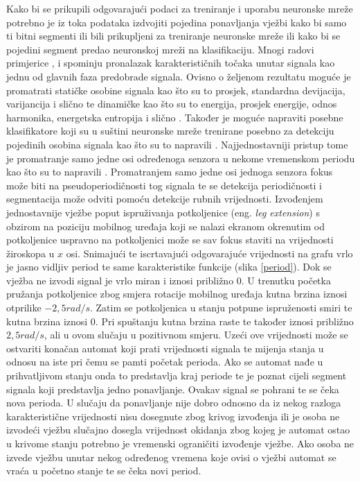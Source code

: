 \documentclass[times, utf8, diplomski]{fer}
\begin{document}
Kako bi se prikupili odgovarajući podaci za treniranje i uporabu neuronske mreže potrebno je iz toka podataka izdvojiti pojedina ponavljanja vježbi kako bi samo ti bitni
segmenti ili bili prikupljeni za treniranje neuronske mreže ili kako bi se pojedini segment predao neuronskoj mreži na klasifikaciju. 
Mnogi radovi primjerice \cite{android}, \cite{exo} i \cite{LowerLimb} spominju pronalazak karakterističnih točaka unutar signala
kao jednu od glavnih faza predobrade signala. Ovisno o željenom rezultatu moguće je promatrati statičke osobine signala
kao što su to prosjek, standardna devijacija, varijancija i slično te dinamičke kao što su to energija, prosjek energije, odnos
harmonika, energetska entropija i slično \citep{android}. Također je moguće napraviti posebne klasifikatore koji su u suštini
neuronske mreže trenirane posebno za detekciju pojedinih osobina signala kao što su to napravili \cite{exo}. 
Najjednostavniji pristup tome je promatranje samo jedne osi određenoga senzora u nekome vremenskom periodu kao što su to napravili
\cite{LowerLimb}. Promatranjem samo jedne osi jednoga senzora fokus može biti na pseudoperiodičnosti tog signala te se detekcija
periodičnosti i segmentacija može odviti pomoću detekcije rubnih vrijednosti. Izvođenjem jednostavnije vježbe poput ispruživanja
potkoljenice (eng. \textit{leg extension}) s obzirom na poziciju mobilnog uređaja koji se nalazi ekranom okrenutim od potkoljenice uspravno na
potkoljenici može se sav fokus staviti na vrijednosti žiroskopa u $x$ osi. Snimajući te iscrtavajući odgovarajuće vrijednosti
na grafu vrlo je jasno vidljiv period te same karakteristike funkcije (slika \ref{period}). Dok se vježba ne izvodi signal je
vrlo miran i iznosi približno 0. U trenutku početka pružanja potkoljenice zbog smjera rotacije mobilnog uređaja kutna brzina iznosi
otprilike $-2,5 rad/s$. Zatim se potkoljenica u stanju potpune ispruženosti smiri te kutna brzina iznosi 0. Pri spuštanju kutna
brzina raste te također iznosi približno $2,5 rad/s$, ali u ovom slučaju u pozitivnom smjeru. Uzeći ove vrijednosti može se ostvariti
konačan automat koji prati vrijednosti signala te mijenja stanja u odnosu na iste pri čemu se pamti početak perioda. Ako se automat nađe u
prihvatljivom stanju onda to predstavlja kraj periode te je poznat cijeli segment signala koji predstavlja jedno ponavljanje.
Ovakav signal se pohrani te se čeka nova perioda. U slučaju da ponavljanje nije dobro odnosno da iz nekog razloga
karakteristične vrijednosti nisu dosegnute zbog krivog izvođenja ili je osoba ne izvodeći vježbu slučajno
dosegla vrijednost okidanja zbog kojeg je automat ostao u krivome stanju potrebno je vremenski ograničiti
izvođenje vježbe. Ako osoba ne izvede vježbu unutar nekog određenog vremena koje ovisi o vježbi automat se vraća
u početno stanje te se čeka novi period.
\end{document}
